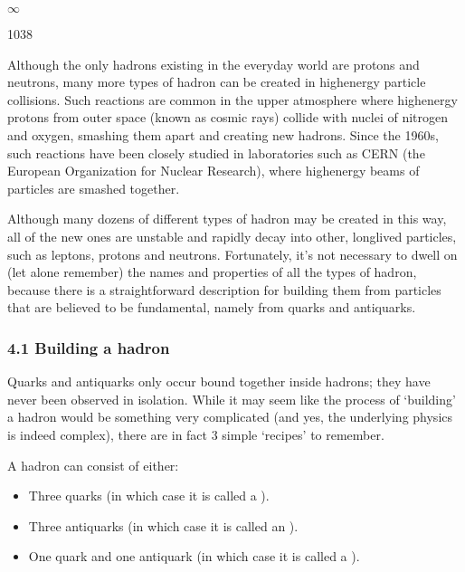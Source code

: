 \documentclass[letterpaper,10pt,english]{sphinxmanual}
\begin{document}
\(\infty\)





10\sphinxhyphen{}38









Although the only hadrons existing in the everyday world are protons and neutrons, many more types of hadron can be created in high\sphinxhyphen{}energy particle collisions. Such reactions are common in the upper atmosphere where high\sphinxhyphen{}energy protons from outer space (known as cosmic rays) collide with nuclei of nitrogen and oxygen, smashing them apart and creating new hadrons. Since the 1960s, such reactions have been closely studied in laboratories such as CERN (the European Organization for Nuclear
Research), where high\sphinxhyphen{}energy beams of particles are smashed together.

Although many dozens of different types of hadron may be created in this way, all of the new ones are unstable and rapidly decay into other, long\sphinxhyphen{}lived particles, such as leptons, protons and neutrons. Fortunately, it’s not necessary to dwell on (let alone remember) the names and properties of all the types of hadron, because there is a straightforward description for building them from particles that are believed to be fundamental, namely from quarks and antiquarks.


\subsubsection{4.1 Building a hadron}
\label{\detokenize{content/session_00/Part_00_04:4.1-Building-a-hadron}}
Quarks and antiquarks only occur bound together inside hadrons; they have never been observed in isolation. While it may seem like the process of ‘building’ a hadron would be something very complicated (and yes, the underlying physics is indeed complex), there are in fact 3 simple ‘recipes’ to remember.

A hadron can consist of either:
\begin{itemize}
\item {} 
Three quarks (in which case it is called a ).

\item {} 
Three antiquarks (in which case it is called an ).

\item {} 
One quark and one antiquark (in which case it is called a ).

\end{itemize}
\end{document}
